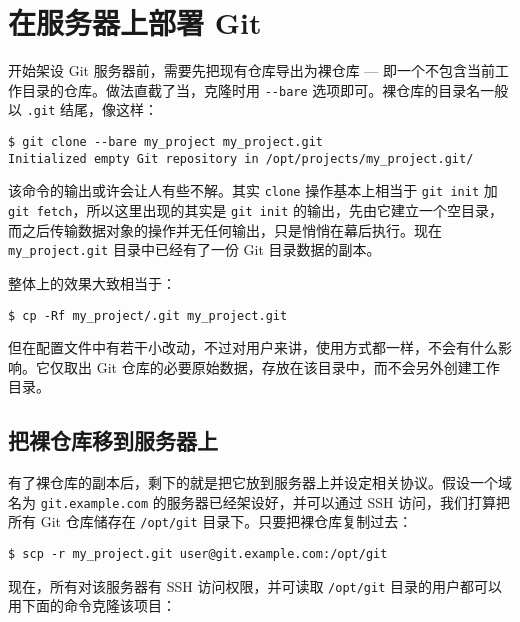 \documentclass[a4paper]{book}
\begin{document}
\section{在服务器上部署 Git}

开始架设 Git 服务器前，需要先把现有仓库导出为裸仓库 --- 即一个不包含当前工作目录的仓库。做法直截了当，克隆时用 \texttt{-{}-bare} 选项即可。裸仓库的目录名一般以 \texttt{.git} 结尾，像这样：

\begin{shaded}\begin{verbatim}
$ git clone --bare my_project my_project.git
Initialized empty Git repository in /opt/projects/my_project.git/
\end{verbatim}\end{shaded}

该命令的输出或许会让人有些不解。其实 \texttt{clone} 操作基本上相当于 \texttt{git init} 加 \texttt{git fetch}，所以这里出现的其实是 \texttt{git init} 的输出，先由它建立一个空目录，而之后传输数据对象的操作并无任何输出，只是悄悄在幕后执行。现在 \texttt{my\_project.git} 目录中已经有了一份 Git 目录数据的副本。

整体上的效果大致相当于：

\begin{shaded}\begin{verbatim}
$ cp -Rf my_project/.git my_project.git
\end{verbatim}\end{shaded}

但在配置文件中有若干小改动，不过对用户来讲，使用方式都一样，不会有什么影响。它仅取出 Git 仓库的必要原始数据，存放在该目录中，而不会另外创建工作目录。

\subsection{把裸仓库移到服务器上}

有了裸仓库的副本后，剩下的就是把它放到服务器上并设定相关协议。假设一个域名为 \texttt{git.example.com} 的服务器已经架设好，并可以通过 SSH 访问，我们打算把所有 Git 仓库储存在 \texttt{/opt/git} 目录下。只要把裸仓库复制过去：

\begin{shaded}\begin{verbatim}
$ scp -r my_project.git user@git.example.com:/opt/git
\end{verbatim}\end{shaded}

现在，所有对该服务器有 SSH 访问权限，并可读取 \texttt{/opt/git} 目录的用户都可以用下面的命令克隆该项目：
\end{document}
